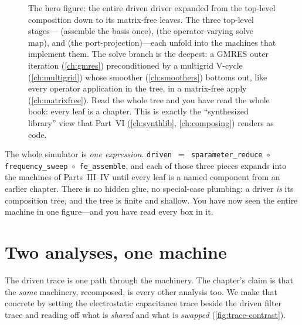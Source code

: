 \begin{figure}[p]
\caption[The driven driver, expanded to its leaves]{The hero figure: the entire
driven driver expanded from the top-level composition down to its matrix-free
leaves. The three top-level stages--- (assemble the basis once),
 (the operator-varying solve map), and
 (the port-projection)---each unfold into the machines
that implement them. The solve branch is the deepest: a GMRES outer iteration
(\cref{ch:gmres}) preconditioned by a multigrid V-cycle (\cref{ch:multigrid})
whose smoother (\cref{ch:smoothers}) bottoms out, like every operator application
in the tree, in a matrix-free apply (\cref{ch:matrixfree}). Read the whole tree
and you have read the whole book: every leaf is a chapter. This is exactly the
``synthesized library'' view that Part~VI (\cref{ch:synthlib}, \cref{ch:composing})
renders as code.}
\label{fig:trace-tree}
\end{figure}

\begin{keyidea}
The whole simulator is \emph{one expression}. \texttt{driven $=$
sparameter\_reduce $\circ$ frequency\_sweep $\circ$ fe\_assemble}, and each of
those three pieces expands into the machines of Parts~III--IV until every leaf is a
named component from an earlier chapter. There is no hidden glue, no special-case
plumbing: a driver \emph{is} its composition tree, and the tree is finite and
shallow. You have now seen the entire machine in one figure---and you have read
every box in it.
\end{keyidea}

\section{Two analyses, one machine}
\label{sec:trace-twoanalyses}

The driven trace is one path through the machinery. The chapter's claim is that the
\emph{same} machinery, recomposed, is every other analysis too. We make that
concrete by setting the electrostatic capacitance trace beside the driven filter
trace and reading off what is \emph{shared} and what is \emph{swapped}
(\cref{fig:trace-contrast}).


